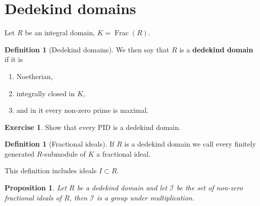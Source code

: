 \documentclass[10pt,]{book}
\newcommand{\terminology}[1]{\textbf{#1}}
\theoremstyle{plain}
\newtheorem{proposition}[theorem]{Proposition}
\theoremstyle{definition}
\newtheorem{definition}[theorem]{Definition}
\newtheorem{exercise}[theorem]{Exercise}
\newcommand{\cI}{\mathcal{I}}
\DeclareMathOperator{\Frac}{Frac}
\begin{document}
\section[Dedekind domains]{Dedekind domains}\label{sec-dedekind}
Let \(R\) be an integral domain, \(K = \Frac(R)\).%
\begin{definition}[Dedekind domains]\label{definition-4}
We then say that \(R\) is a \terminology{dedekind domain} if it is
            \begin{enumerate}
\item{}Noetherian,\item{}integrally closed in \(K\),\item{}and in it every non-zero prime is maximal.\end{enumerate}
\end{definition}
\begin{exercise}\label{exercise-1}
Show that every PID is a dedekind domain.\end{exercise}
\begin{definition}[Fractional ideals]\label{definition-5}
If \(R\) is a dedekind domain we call every finitely generated \(R\)-submodule of \(K\) a fractional ideal.\end{definition}
\par
This definition includes ideals \(I\subset R\).%
\begin{proposition}\label{proposition-1}
Let \(R\) be a dedekind domain and let \(\cI\) be the set of non-zero fractional ideals of \(R\), then \(\cI\) is a group under multiplication.\end{proposition}
\end{document}
